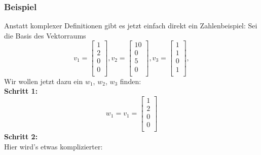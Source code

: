 \documentclass{article}
\begin{document}
		\subsubsection{Beispiel}
			Anstatt komplexer Definitionen gibt es jetzt einfach direkt ein Zahlenbeispiel: Sei die Basis des Vektorraums\\
			\begin{equation*}
				v_1 = \begin{bmatrix} 1 \\ 2 \\ 0 \\ 0 \\ \end{bmatrix}, 
				v_2 = \begin{bmatrix} 10 \\ 0 \\ 5 \\ 0 \\ \end{bmatrix}, 
				v_3 = \begin{bmatrix} 1 \\ 1 \\ 0 \\ 1 \\ \end{bmatrix}, 
			\end{equation*}
			Wir wollen jetzt dazu ein $w_1$, $w_2$, $w_3$ finden: \\
			\textbf{Schritt 1:}
			\begin{equation*} w_1 = v_1 = \begin{bmatrix} 1 \\ 2 \\ 0 \\ 0 \\ \end{bmatrix} \end{equation*}
			\textbf{Schritt 2:}\\
			Hier wird's etwas komplizierter:
\end{document}
